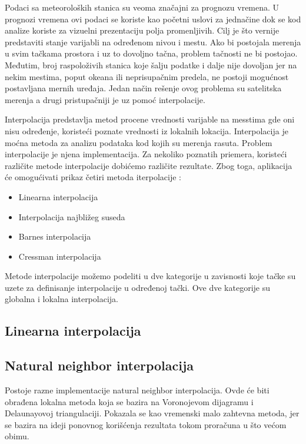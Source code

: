 \documentclass[12pt]{article}
\begin{document}
Podaci sa meteoroloških stanica su veoma značajni za prognozu vremena. U prognozi vremena ovi podaci se koriste kao početni uslovi za jednačine dok se kod analize koriste za vizuelni prezentaciju polja promenljivih. Cilj je što vernije predstaviti stanje varijabli na određenom nivou i mestu. Ako bi postojala merenja u svim tačkama prostora i uz to dovoljno tačna, problem tačnosti ne bi postojao. Međutim, broj raspoloživih stanica koje šalju podatke i dalje nije dovoljan jer na nekim mestima, poput okeana ili neprisupačnim predela, ne postoji mogućnost postavljana mernih uređaja. Jedan način rešenje ovog problema su satelitska merenja a drugi pristupačniji je uz pomoć interpolacije.

Interpolacija predstavlja metod procene vrednosti varijable na messtima gde oni nisu određenje, koristeći poznate vrednosti iz lokalnih lokacija. Interpolacija je moćna metoda za analizu podataka kod kojih su merenja rasuta. Problem interpolacije je njena implementacija. Za nekoliko poznatih priemera, koristeći različite metode interpolacije dobićemo različite rezultate. Zbog toga, aplikacija će omogućivati prikaz četiri metoda iterpolacije :
\begin{itemize}
\item Linearna interpolacija
\item Interpolacija najbližeg suseda
\item Barnes interpolacija
\item Cressman interpolacija
\end{itemize}
Metode interpolacije možemo podeliti u dve kategorije u zavisnosti koje tačke su uzete za definisanje interpolacije u određenoj tački. Ove dve kategorije su globalna i lokalna interpolacija.
\subsection{Linearna interpolacija}
\subsection{Natural neighbor interpolacija}
Postoje razne implementacije natural neighbor interpolacija. Ovde će biti obrađena lokalna metoda koja se bazira na Voronojevom dijagramu i Delaunayovoj triangulaciji. Pokazala se kao vremenski malo zahtevna metoda, jer se bazira na ideji ponovnog korišćenja rezultata tokom proračuna u što većom obimu.
\end{document}
